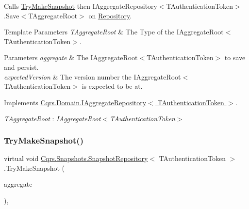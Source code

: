 Calls \hyperlink{classCqrs_1_1Snapshots_1_1SnapshotRepository_a06b3211ded753ed79c3080819b16d496_a06b3211ded753ed79c3080819b16d496}{Try\+Make\+Snapshot} then I\+Aggregate\+Repository$<$\+T\+Authentication\+Token$>$.\+Save$<$\+T\+Aggregate\+Root$>$ on \hyperlink{classCqrs_1_1Snapshots_1_1SnapshotRepository_a64b1457cd45056fb7affd2aa8cd07d9e_a64b1457cd45056fb7affd2aa8cd07d9e}{Repository}. 


\begin{DoxyTemplParams}{Template Parameters}
{\em T\+Aggregate\+Root} & The Type of the I\+Aggregate\+Root$<$\+T\+Authentication\+Token$>$.\\
\hline
\end{DoxyTemplParams}

\begin{DoxyParams}{Parameters}
{\em aggregate} & The I\+Aggregate\+Root$<$\+T\+Authentication\+Token$>$ to save and persist.\\
\hline
{\em expected\+Version} & The version number the I\+Aggregate\+Root$<$\+T\+Authentication\+Token$>$ is expected to be at.\\
\hline
\end{DoxyParams}


Implements \hyperlink{interfaceCqrs_1_1Domain_1_1IAggregateRepository_a306baf8aa6faabe893f93e5db5d3517d_a306baf8aa6faabe893f93e5db5d3517d}{Cqrs.\+Domain.\+I\+Aggregate\+Repository$<$ T\+Authentication\+Token $>$}.

\begin{Desc}
\item[Type Constraints]\begin{description}
\item[{\em T\+Aggregate\+Root} : {\em I\+Aggregate\+Root$<$T\+Authentication\+Token$>$}]\end{description}
\end{Desc}
\mbox{\label{classCqrs_1_1Snapshots_1_1SnapshotRepository_a06b3211ded753ed79c3080819b16d496_a06b3211ded753ed79c3080819b16d496}} 
\subsubsection{\texorpdfstring{Try\+Make\+Snapshot()}{TryMakeSnapshot()}}
{\footnotesize\ttfamily virtual void \hyperlink{classCqrs_1_1Snapshots_1_1SnapshotRepository}{Cqrs.\+Snapshots.\+Snapshot\+Repository}$<$ T\+Authentication\+Token $>$.Try\+Make\+Snapshot (\begin{DoxyParamCaption}\item[{\hyperlink{interfaceCqrs_1_1Domain_1_1IAggregateRoot}{I\+Aggregate\+Root}$<$ T\+Authentication\+Token $>$}]{aggregate }\end{DoxyParamCaption})\hspace{0.3cm}{\ttfamily [protected]}, {\ttfamily [virtual]}}




